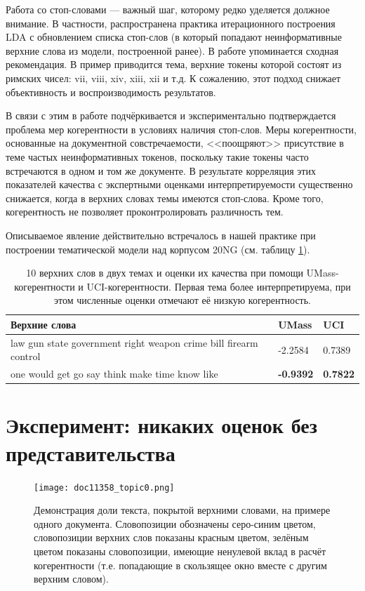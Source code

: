 Работа со стоп-словами --- важный шаг, которому редко уделяется должное внимание. В частности, распространена практика итерационного построения LDA с обновлением списка стоп-слов (в который попадают неинформативные верхние слова из модели, построенной ранее). В работе \cite{boydcare} упоминается сходная рекомендация. В пример приводится тема, верхние токены которой состоят из римских чисел: vii, viii, xiv, xiii, xii и т.д. К сожалению, этот подход снижает объективность и воспроизводимость результатов.

В связи с этим в работе \cite{fan2019assessing} подчёркивается и экспериментально подтверждается проблема мер когерентности в условиях наличия стоп-слов. Меры когерентности, основанные на документной совстречаемости, <<поощряют>> присутствие в теме частых неинформативных токенов, поскольку такие токены часто встречаются в одном и том же документе. В результате корреляция
этих показателей качества с экспертными оценками интерпретируемости существенно снижается, когда в верхних словах темы имеются стоп-слова. Кроме того, когерентность не позволяет проконтролировать различность тем.

Описываемое явление действительно встречалось в нашей практике при построении тематической модели над корпусом 20NG (см. таблицу \ref{fig:law_gun_would}).

\begin{table}[ht]
    \caption{10 верхних слов в двух темах и оценки их качества при помощи UMass-когерентности и UCI-когерентности. Первая тема более интерпретируема, при этом численные оценки отмечают её низкую когерентность.}
    \label{fig:law_gun_would}
    \small
    \begin{tabular}{ | p{7.5cm}| p{3.5cm} |p{3.5cm} |}
    \hline
    Верхние слова &  UMass & UCI
    \\ \hline	
law gun state government right weapon crime bill firearm control &
-2.2584 & 0.7389
    \\ \hline
one would get go say think make time know like & \textbf{-0.9392} & \textbf{0.7822}
    \\ \hline
    \end{tabular}
\end{table}

\section{Эксперимент: никаких оценок без представительства}
\label{sec:represented}


\begin{figure}
        \texttt{[image: doc11358\_topic0.png]} %
    \caption{Демонстрация доли текста, покрытой верхними словами, на примере одного документа. Словопозиции обозначены серо-синим цветом, словопозиции верхних слов показаны красным цветом, зелёным цветом показаны словопозиции, имеющие ненулевой вклад в расчёт когерентности (т.е. попадающие в скользящее окно вместе с другим верхним словом).}
\label{fig:ch3_doc_compound}
\end{figure}


